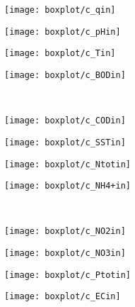 \begin{figure}[h]
	\begin{subfigure}{0.24\textwidth}
		\texttt{[image: boxplot/c\_qin]}	\centering
	\end{subfigure}
	\begin{subfigure}{0.24\textwidth}
		\texttt{[image: boxplot/c\_pHin]}	\centering
	\end{subfigure}
	\begin{subfigure}{0.24\textwidth}
		\texttt{[image: boxplot/c\_Tin]}	\centering
	\end{subfigure}
	\begin{subfigure}{0.24\textwidth}
		\texttt{[image: boxplot/c\_BODin]}	\centering
	\end{subfigure}
	\\[1ex]
	\begin{subfigure}{0.24\textwidth}
		\texttt{[image: boxplot/c\_CODin]}	\centering
	\end{subfigure}
	\begin{subfigure}{0.24\textwidth}
		\texttt{[image: boxplot/c\_SSTin]}	\centering
	\end{subfigure}
	\begin{subfigure}{0.24\textwidth}
		\texttt{[image: boxplot/c\_Ntotin]}	\centering
	\end{subfigure}
	\begin{subfigure}{0.24\textwidth}
		\texttt{[image: boxplot/c\_NH4+in]}	\centering
	\end{subfigure}
	\\[1ex]
	\begin{subfigure}{0.24\textwidth}
		\texttt{[image: boxplot/c\_NO2in]}	\centering
	\end{subfigure}
	\begin{subfigure}{0.24\textwidth}
		\texttt{[image: boxplot/c\_NO3in]}	\centering
	\end{subfigure}
	\begin{subfigure}{0.24\textwidth}
		\texttt{[image: boxplot/c\_Ptotin]}	\centering
	\end{subfigure}
	\begin{subfigure}{0.24\textwidth}
		\texttt{[image: boxplot/c\_ECin]}	\centering
	\end{subfigure}
	\\[1ex]
	\begin{subfigure}{0.24\textwidth}

\end{subfigure}
\end{figure}
